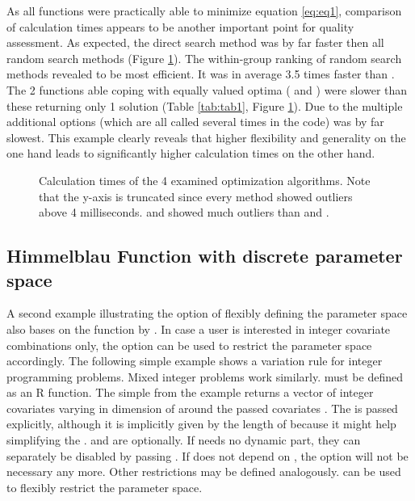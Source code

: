As all functions were practically able to minimize equation \ref{eq:eq1}, comparison of calculation times appears to be another important point for quality assessment. As expected, the direct search method  was by far faster then all random search methods (Figure \ref{fig:fig1}). The within-group ranking of random search methods revealed  to be most efficient. It was in average 3.5 times faster than . The 2 functions able coping with equally valued optima ( and ) were slower than these returning only 1 solution (Table \ref{tab:tab1}, Figure \ref{fig:fig1}). Due to the multiple additional options (which are all called several times in the code)  was by far slowest. This example clearly reveals that higher flexibility and generality on the one hand leads to significantly higher calculation times on the other hand.

\begin{figure}[htbp]
	\centering
	\resizebox{.6\linewidth}{!}{}
	\caption{Calculation times of the 4 examined optimization algorithms. Note that the y-axis is truncated since every method showed outliers above 4 milliseconds.  and  showed much outliers than  and .}
	\label{fig:fig1}
\end{figure}

\subsection{Himmelblau Function with discrete parameter space}
A second example illustrating the option of flexibly defining the parameter space also bases on the function by \citet{himmelblau_1972}. In case a user is interested in integer covariate combinations only, the  option can be used to restrict the parameter space accordingly. The following simple example shows a variation rule for integer programming problems. Mixed integer problems work similarly.  must be defined as an R function. The simple  from the example returns a vector of integer covariates varying in dimension of  around the passed covariates . The  is passed explicitly, although it is implicitly given by the length of  because it might help simplifying the .  and  are optionally. If  needs no dynamic part, they can separately be disabled by passing . If  does not depend on , the option  will not be necessary any more. Other restrictions may be defined analogously.  can be used to flexibly restrict the parameter space.

